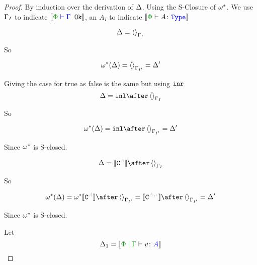 \documentclass{report}
\begin{document}
\begin{framed}
    \begin{proof}
        By induction over the derivation of $\Delta$. Using the S-Closure of $\omega^*$. We use $\Gamma_I$ to indicate $\deno{\wellformedok{\P}{\G}}$, an $A_I$ to indicate $\deno{\typerelation{\P}{A}{\type}}$
        
        
        \begin{equation}
            \Delta = \left\langle\right\rangle_{\Gamma_I}
        \end{equation}
        
        So
        
        \begin{equation}
            \omega^*(\Delta) = \left\langle\right\rangle_{\Gamma_{I'}} = \Delta'
        \end{equation}
        
        Giving the case for true as false is the same but using $\texttt{inr}$
        \begin{equation}
            \D = \inl\after\term{\G_I}
        \end{equation}
        
        So
        
        \begin{equation}
            \w\star(\D) = \inl\after \term{\G_{I'}} = \D'
        \end{equation}
        
        Since $\omega^*$ is S-closed.
        
        
        
        \begin{equation}
            \D = \deno{\const{A}}\after\term{\G_I}
        \end{equation}
        
        So
        
        \begin{equation}
            \w\star(\D) = \w\star\deno{\const{A}}\after \term{\G_{I'}}=\deno{\const{A_{I'}}}\after \term{\G_{I'}}  = \D'
        \end{equation}
        
        Since $\omega^*$ is S-closed.
        
        
        Let \begin{equation}
            \D_1 = \deno{\gpetyperelation{v}{A}}
        \end{equation}
        

\end{proof}
\end{framed}
\end{document}
